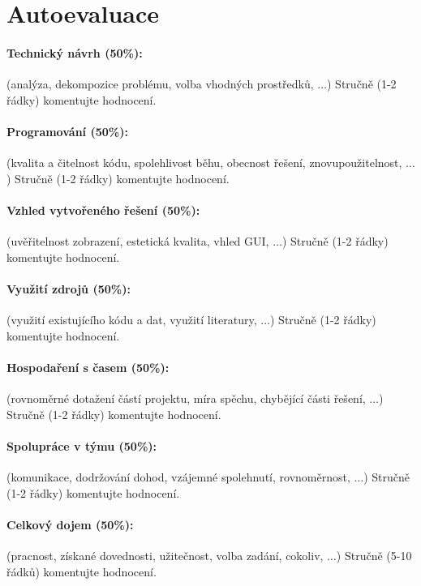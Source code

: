 \documentclass[11pt,a4paper]{article}
\begin{document}
\section{Autoevaluace}

\paragraph{Technický návrh (50\%):} (analýza, dekompozice problému, volba
vhodných prostředků, $\ldots$) 
Stručně (1-2 řádky) komentujte hodnocení. 

\paragraph{Programování (50\%):} (kvalita a čitelnost kódu, spolehlivost běhu,
obecnost řešení, znovupoužitelnost, $\ldots$)
Stručně (1-2 řádky) komentujte hodnocení. 

\paragraph{Vzhled vytvořeného řešení (50\%):} (uvěřitelnost zobrazení,
estetická kvalita, vhled GUI, $\ldots$)
Stručně (1-2 řádky) komentujte hodnocení. 

\paragraph{Využití zdrojů (50\%):} (využití existujícího kódu a dat, využití
literatury, $\ldots$)
Stručně (1-2 řádky) komentujte hodnocení. 

\paragraph{Hospodaření s časem (50\%):} (rovnoměrné dotažení částí projektu,
míra spěchu, chybějící části řešení, $\ldots$)
Stručně (1-2 řádky) komentujte hodnocení. 

\paragraph{Spolupráce v týmu (50\%):} (komunikace, dodržování dohod, vzájemné
spolehnutí, rovnoměrnost, $\ldots$)
Stručně (1-2 řádky) komentujte hodnocení. 

\paragraph{Celkový dojem (50\%):} (pracnost, získané dovednosti, užitečnost,
volba zadání, cokoliv, $\ldots$)
Stručně (5-10 řádků) komentujte hodnocení. 
\end{document}
